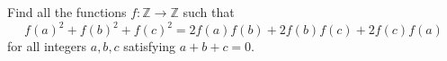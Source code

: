 Find all the functions $f : \mathbb{Z} \to \mathbb{Z}$ such that
\[
f(a)^2 + f(b)^2 + f(c)^2 = 2f(a)f(b) + 2f(b)f(c) + 2f(c)f(a)
\]
for all integers $a, b, c$ satisfying $a + b + c = 0$.
